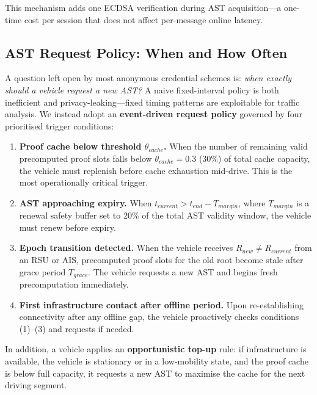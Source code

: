 This mechanism adds one ECDSA verification during AST acquisition---a one-time cost
per session that does not affect per-message online latency.

\subsection{AST Request Policy: When and How Often}
\label{sec:ast_policy}

A question left open by most anonymous credential schemes is: \emph{when exactly
should a vehicle request a new AST?} A naive fixed-interval policy is both
inefficient and privacy-leaking---fixed timing patterns are exploitable for traffic
analysis. We instead adopt an \textbf{event-driven request policy} governed by four
prioritised trigger conditions:

\begin{enumerate}
    \item \textbf{Proof cache below threshold $\theta_{cache}$.} When the number of
    remaining valid precomputed proof slots falls below $\theta_{cache} = 0.3$ (30\%)
    of total cache capacity, the vehicle must replenish before cache exhaustion
    mid-drive. This is the most operationally critical trigger.

    \item \textbf{AST approaching expiry.} When $t_{current} > t_{end} - T_{margin}$,
    where $T_{margin}$ is a renewal safety buffer set to 20\% of the total AST
    validity window, the vehicle must renew before expiry.

    \item \textbf{Epoch transition detected.} When the vehicle receives
    $R_{new} \neq R_{current}$ from an RSU or AIS, precomputed proof slots for the
    old root become stale after grace period $T_{grace}$. The vehicle requests a
    new AST and begins fresh precomputation immediately.

    \item \textbf{First infrastructure contact after offline period.} Upon
    re-establishing connectivity after any offline gap, the vehicle proactively
    checks conditions (1)--(3) and requests if needed.
\end{enumerate}

In addition, a vehicle applies an \textbf{opportunistic top-up} rule: if
infrastructure is available, the vehicle is stationary or in a low-mobility state,
and the proof cache is below full capacity, it requests a new AST to maximise the
cache for the next driving segment.

